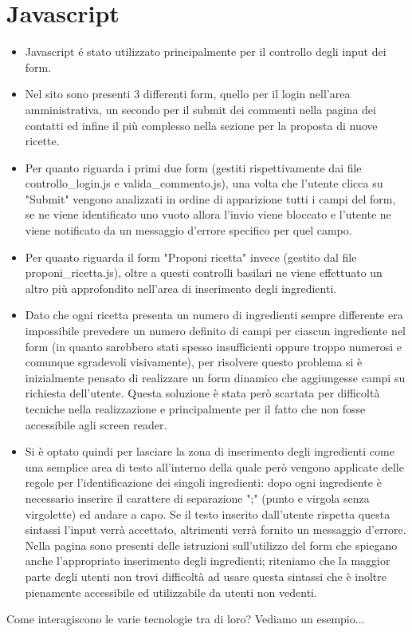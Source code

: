 \documentclass[12pt]{article}
\begin{document}
			\section{Javascript}
			\begin{itemize}
				

				\item Javascript \'e stato utilizzato principalmente per il controllo degli input dei form. 
				\item Nel sito sono presenti 3 differenti form, quello per il login nell'area amministrativa, un secondo per il submit dei commenti nella pagina dei contatti ed infine il pi\`u complesso nella sezione per la proposta di nuove ricette. 
				\item Per quanto riguarda i primi due form (gestiti rispettivamente dai file controllo\_login.js e valida\_commento.js), una volta che l'utente clicca su "Submit" vengono analizzati in ordine di apparizione tutti i campi del form, se ne viene identificato uno vuoto allora l'invio viene bloccato e l'utente ne viene notificato da un messaggio d'errore specifico per quel campo.
				\item Per quanto riguarda il form "Proponi ricetta" invece (gestito dal file proponi\_ricetta.js), oltre a questi controlli basilari ne viene effettuato un altro pi\`u approfondito nell'area di inserimento degli ingredienti. 
				\item Dato che ogni ricetta presenta un numero di ingredienti sempre differente era impossibile prevedere un numero definito di campi per ciascun ingrediente nel form (in quanto sarebbero stati spesso insufficienti oppure troppo numerosi e comunque sgradevoli visivamente), per risolvere questo problema si \`e inizialmente pensato di realizzare un form dinamico che aggiungesse campi su richiesta dell'utente. Questa soluzione \`e stata però scartata per difficolt\`a tecniche nella realizzazione e principalmente per il fatto che non fosse accessibile agli screen reader. 
				\item Si \`e optato quindi per lasciare la zona di inserimento degli ingredienti come una semplice area di testo all'interno della quale per\`o vengono applicate delle regole per l'identificazione dei singoli ingredienti: dopo ogni ingrediente \`e necessario inserire il carattere di separazione ";" (punto e virgola senza virgolette) ed andare a capo. Se il testo inserito dall'utente rispetta questa sintassi l'input verr\`a accettato, altrimenti verr\`a fornito un messaggio d'errore. Nella pagina sono presenti delle istruzioni sull'utilizzo del form che spiegano anche l'appropriato inserimento degli ingredienti; riteniamo che la maggior parte degli utenti non trovi difficolt\`a ad usare questa sintassi che \`e inoltre pienamente accessibile ed utilizzabile da utenti non vedenti.		
		
			\end{itemize}
	\newpage
	Come interagiscono le varie tecnologie tra di loro? Vediamo un esempio...
\end{document}
